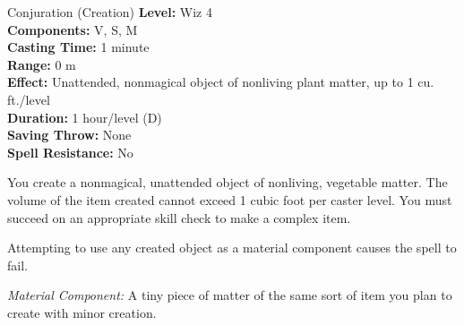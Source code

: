 {Conjuration (Creation)}
{
	\textbf{Level:}
	Wiz 4\\
	\textbf{Components:}
	V, S, M\\
	\textbf{Casting Time:}
	1 minute\\
	\textbf{Range:}
	0 m\\
	\textbf{Effect:}
	Unattended, nonmagical object of nonliving plant matter, up to 1 cu. ft./level\\
	\textbf{Duration:}
	1 hour/level (D)\\
	\textbf{Saving Throw:}
	None\\
	\textbf{Spell Resistance:}
	No\\
}
{
	You create a nonmagical, unattended object of nonliving, vegetable matter. The volume of the item created cannot exceed 1 cubic foot per caster level. You must succeed on an appropriate skill check to make a complex item.

	Attempting to use any created object as a material component causes the spell to fail.

	\textit{Material Component:}
	A tiny piece of matter of the same sort of item you plan to create with minor creation.

}
